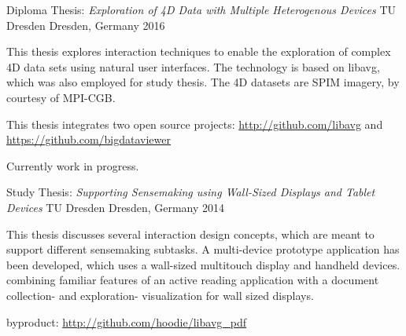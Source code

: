\begin{cventries}

  \cventry
    {Diploma Thesis: \quad
      \textit{Exploration of 4D Data with Multiple Heterogenous Devices}}
    {TU Dresden}
    {Dresden, Germany}
    {2016}
    {
      \begin{cvitems}
      \item[]{
          This thesis explores interaction techniques to enable the exploration of complex 4D data sets using natural user interfaces.
          The technology is based on libavg, which was also employed for study thesis.
          The 4D datasets are SPIM imagery, by courtesy of MPI-CGB.
        }
      \item[]{This thesis integrates two open source projects: \url{http://github.com/libavg} and \url{https://github.com/bigdataviewer}}
      \item[]{Currently work in progress.}
      \end{cvitems}
    }

  \cventry
    {Study Thesis:\quad
      \textit{Supporting Sensemaking using Wall-Sized Displays and Tablet Devices}}
    {TU Dresden}
    {Dresden, Germany}
    {2014}
    {
      \begin{cvitems}
      \item[] {
        This thesis discusses several interaction design concepts,
        which are meant to support different sensemaking subtasks.
        A multi-device prototype application has been developed,
        which uses a wall-sized multitouch display and handheld devices.
        combining familiar features of an active reading application with a document collection- and exploration- visualization for wall sized displays.
        }
      \item[] {byproduct: \url{http://github.com/hoodie/libavg_pdf}}
      \end{cvitems}
    }


\end{cventries}
